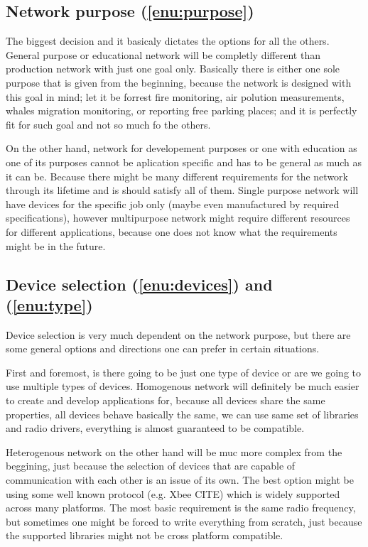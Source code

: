 \documentclass[
  digital, %
  table,   %
  nolof,     %
  nolot,     %
           oneside
]{fithesis3}
\begin{document}
  \subsection{Network purpose (\ref{enu:purpose})}
  The biggest decision and it basicaly dictates the options for all the others. General purpose or educational network will be completly different than production network with just one goal only. Basically there is either one sole purpose that is given from the beginning, because the network is designed with this goal in mind; let it be forrest fire monitoring, air polution measurements, whales migration monitoring, or reporting free parking places; and it is perfectly fit for such goal and not so much fo the others.

  On the other hand, network for developement purposes or one with education as one of its purposes cannot be aplication specific and has to be general as much as it can be. Because there might be many different requirements for the network through its lifetime and is should satisfy all of them. Single purpose network will have devices for the specific job only (maybe even manufactured by required specifications), however multipurpose network might require different resources for different applications, because one does not know what the requirements might be in the future.

  \subsection{Device selection (\ref{enu:devices}) and (\ref{enu:type})}
  Device selection is very much dependent on the network purpose, but there are some general options and directions one can prefer in certain situations.

  First and foremost, is there going to be just one type of device or are we going to use multiple types of devices. Homogenous network will definitely be much easier to create and develop applications for, because all devices share the same properties, all devices behave basically the same, we can use same set of libraries and radio drivers, everything is almost guaranteed to be compatible.

  Heterogenous network on the other hand will be muc more complex from the beggining, just because the selection of devices that are capable of communication with each other is an issue of its own. The best option might be using some well known protocol (e.g. Xbee CITE) which is widely supported across many platforms. The most basic requirement is the same radio frequency, but sometimes one might be forced to write everything from scratch, just because the supported libraries might not be cross platform compatible.
\end{document}
